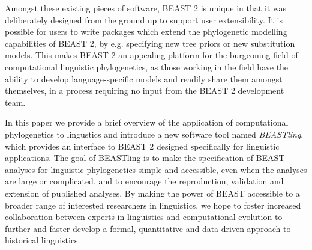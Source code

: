 \documentclass[twocolumn,10pt]{scrartcl}
\begin{document}
Amongst these existing pieces of software, BEAST 2 is unique in that it was deliberately designed from the ground up to support user extensibility.  It is possible for users to write packages which extend the phylogenetic modelling capabilities of BEAST 2, by e.g. specifying new tree priors or new substitution models.  This makes BEAST 2 an appealing platform for the burgeoning field of computational linguistic phylogenetics, as those working in the field have the ability to develop language-specific models and readily share them amongst themselves, in a process requiring no input from the BEAST 2 development team.

In this paper we provide a brief overview of the application of computational phylogenetics to lingustics and introduce a new software tool named \emph{BEASTling}, which provides an interface to BEAST 2 designed specifically for linguistic applications.  The goal of BEASTling is to make the specification of BEAST analyses for linguistic phylogenetics simple and accessible, even when the analyses are large or complicated, and to encourage the reproduction, validation and extension of published analyses.  By making the power of BEAST accessible to a broader range of interested researchers in linguistics, we hope to foster increased collaboration between experts in linguistics and computational evolution to further and faster develop a formal, quantitative and data-driven approach to historical linguistics.

\end{document}
